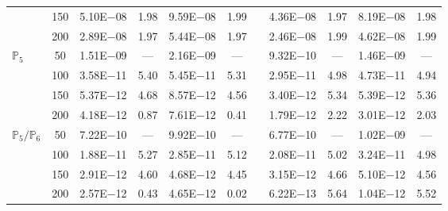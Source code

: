 \begin{table}[H]
{\begin{tabular}{@{}l c c c c c c c c c c@{}}
 & 150 & 5.10E$-$08 & 1.98  & 9.59E$-$08 & 1.99 &  & 4.36E$-$08 & 1.97 & 8.19E$-$08 & 1.98\\
 & 200 & 2.89E$-$08 & 1.97  & 5.44E$-$08 & 1.97 &  & 2.46E$-$08 & 1.99 & 4.62E$-$08 & 1.99\\
\midrule
\multirow{4}{*}{$\mathbb{P}_{5}$}
 & 50 & 1.51E$-$09 & ---  & 2.16E$-$09 & --- &  & 9.32E$-$10 & --- & 1.46E$-$09 & ---\\
 & 100 & 3.58E$-$11 & 5.40  & 5.45E$-$11 & 5.31 &  & 2.95E$-$11 & 4.98 & 4.73E$-$11 & 4.94\\
 & 150 & 5.37E$-$12 & 4.68  & 8.57E$-$12 & 4.56 &  & 3.40E$-$12 & 5.34 & 5.39E$-$12 & 5.36\\
 & 200 & 4.18E$-$12 & 0.87  & 7.61E$-$12 & 0.41 &  & 1.79E$-$12 & 2.22 & 3.01E$-$12 & 2.03\\
\midrule
\multirow{4}{*}{$\mathbb{P}_{5}/\mathbb{P}_{6}$}
 & 50 & 7.22E$-$10 & ---  & 9.92E$-$10 & --- &  & 6.77E$-$10 & --- & 1.02E$-$09 & ---\\
 & 100 & 1.88E$-$11 & 5.27  & 2.85E$-$11 & 5.12 &  & 2.08E$-$11 & 5.02 & 3.24E$-$11 & 4.98\\
 & 150 & 2.91E$-$12 & 4.60  & 4.68E$-$12 & 4.45 &  & 3.15E$-$12 & 4.66 & 5.10E$-$12 & 4.56\\
 & 200 & 2.57E$-$12 & 0.43  & 4.65E$-$12 & 0.02 &  & 6.22E$-$13 & 5.64 & 1.04E$-$12 & 5.52\\
\bottomrule
\end{tabular}}
\label{none}
\end{table}
